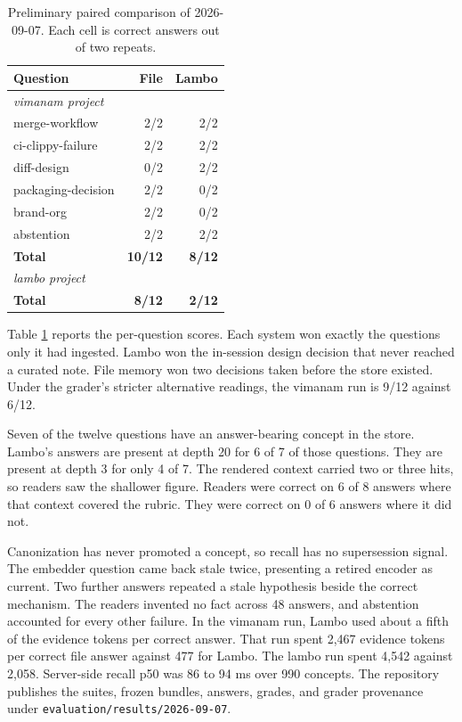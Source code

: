 \documentclass[10pt,twocolumn]{article}
\begin{document}
\begin{table}[t]
\centering
\caption{Preliminary paired comparison of 2026-09-07. Each cell is correct answers out of two repeats.}
\label{tab:paired}
\scriptsize
\begin{tabular*}{\columnwidth}{@{\extracolsep{\fill}}lrr@{}}
\toprule
\textbf{Question} & \textbf{File} & \textbf{Lambo} \\
\midrule
\multicolumn{3}{l}{\textit{vimanam project}} \\
merge-workflow & 2/2 & 2/2 \\
ci-clippy-failure & 2/2 & 2/2 \\
diff-design & 0/2 & 2/2 \\
packaging-decision & 2/2 & 0/2 \\
brand-org & 2/2 & 0/2 \\
abstention & 2/2 & 2/2 \\
\textbf{Total} & \textbf{10/12} & \textbf{8/12} \\
\midrule
\multicolumn{3}{l}{\textit{lambo project}} \\
\textbf{Total} & \textbf{8/12} & \textbf{2/12} \\
\bottomrule
\end{tabular*}
\end{table}

Table \ref{tab:paired} reports the per-question scores. Each system won exactly the questions only it had ingested.
Lambo won the in-session design decision that never reached a curated note. File memory won two decisions taken before the store existed.
Under the grader's stricter alternative readings, the vimanam run is 9/12 against 6/12.

Seven of the twelve questions have an answer-bearing concept in the store.
Lambo's answers are present at depth 20 for 6 of 7 of those questions. They are present at depth 3 for only 4 of 7.
The rendered context carried two or three hits, so readers saw the shallower figure.
Readers were correct on 6 of 8 answers where that context covered the rubric. They were correct on 0 of 6 answers where it did not.

Canonization has never promoted a concept, so recall has no supersession signal.
The embedder question came back stale twice, presenting a retired encoder as current.
Two further answers repeated a stale hypothesis beside the correct mechanism.
The readers invented no fact across 48 answers, and abstention accounted for every other failure.
In the vimanam run, Lambo used about a fifth of the evidence tokens per correct answer.
That run spent 2,467 evidence tokens per correct file answer against 477 for Lambo. The lambo run spent 4,542 against 2,058.
Server-side recall p50 was 86 to 94 ms over 990 concepts.
The repository publishes the suites, frozen bundles, answers, grades, and grader provenance under \texttt{evaluation/results/2026-09-07}.
\end{document}
